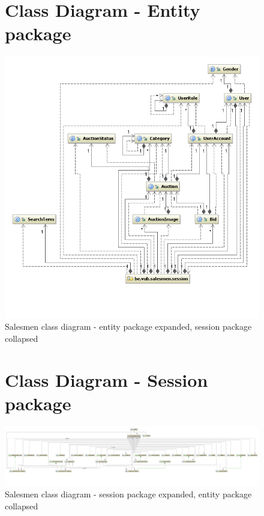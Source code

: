 \documentclass[salesmen, twoside]{../../../templates/latex/2009/softproj}
\begin{document}
\begin{projdoc}
\begin{figure}
\section{Class Diagram - Entity package}
\label{fig_class1}
\includegraphics[scale=0.5]{../../img/salesmen_class_entity.png}
\caption{Salesmen class diagram - entity package expanded, session package collapsed}
\end{figure}

\begin{figure}
\section{Class Diagram - Session package}
\label{fig_class2}
\includegraphics[scale=0.20,angle=90]{../../img/salesmen_class_session.png}
\caption{Salesmen class diagram - session package expanded, entity package collapsed}
\end{figure}

\begin{figure}

\end{figure}
\end{projdoc}
\end{document}
